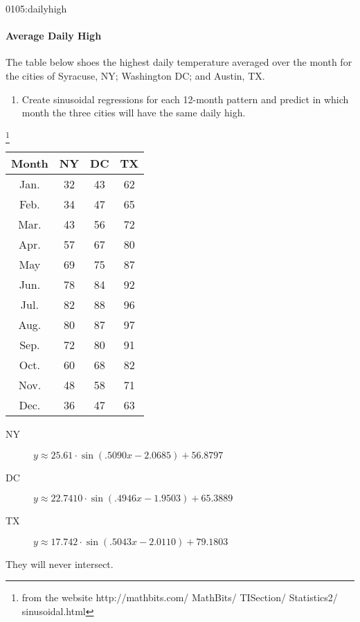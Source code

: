 \begin{defproblem}{0105:dailyhigh}
\begin{onlyproblem}
\paragraph{Average Daily High}
The table below shoes the highest daily temperature 
averaged over the month for the cities of Syracuse, NY;
Washington DC; and Austin, TX.  
\begin{enumerate}
\item Create sinusoidal regressions for each 12-month pattern and predict in which month the three cities will have the same daily high.
\end{enumerate}
\footnote{from the website http://mathbits.com/ MathBits/ 
TISection/ Statistics2/ sinusoidal.html}
\begin{tabular}{c|c|c|c}
	\textbf{Month} & \textbf{NY} & \textbf{DC} & \textbf{TX} \\ \hline
	Jan. & 32 & 43 & 62\\
	Feb. & 34 & 47 & 65 \\
	Mar. & 43 & 56 & 72 \\
	Apr. & 57 & 67 & 80 \\
	May & 69 & 75 & 87 \\
	Jun. & 78 & 84 & 92 \\
	Jul. & 82 & 88 & 96 \\
	Aug. & 80 & 87 & 97 \\
	Sep. & 72 & 80 & 91 \\
	Oct. & 60 & 68 & 82\\
	Nov. & 48 & 58 & 71 \\
	Dec. & 36 & 47 & 63 \\
\end{tabular}
\end{onlyproblem}
\begin{onlysolution}
\begin{description}
\item[NY] $y\approx25.61\cdot{}\sin(.5090x-2.0685)+56.8797$
\item[DC] $y\approx22.7410\cdot{}\sin(.4946x-1.9503)+65.3889$
\item[TX] $y\approx17.742\cdot{}\sin(.5043x-2.0110)+79.1803$
\end{description}
They will never intersect.
\end{onlysolution}
\end{defproblem}



